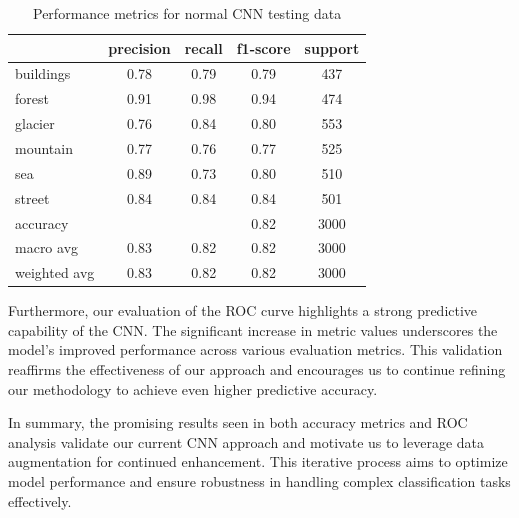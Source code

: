 \documentclass[conference]{IEEEtran}
\begin{document}
\begin{table}[H]
\centering
\begin{tabular}{lcccc}
\toprule
\textbf{} & \textbf{precision} & \textbf{recall} & \textbf{f1-score} & \textbf{support} \\
\midrule
buildings & 0.78 & 0.79 & 0.79 & 437 \\
forest & 0.91 & 0.98 & 0.94 & 474 \\
glacier & 0.76 & 0.84 & 0.80 & 553 \\
mountain & 0.77 & 0.76 & 0.77 & 525 \\
sea & 0.89 & 0.73 & 0.80 & 510 \\
street & 0.84 & 0.84 & 0.84 & 501 \\
\midrule
accuracy & & & 0.82 & 3000 \\
macro avg & 0.83 & 0.82 & 0.82 & 3000 \\
weighted avg & 0.83 & 0.82 & 0.82 & 3000 \\
\bottomrule
\end{tabular}
\caption{Performance metrics for normal CNN testing data}
\end{table}

Furthermore, our evaluation of the ROC curve highlights a strong predictive capability of the CNN. The significant increase in metric values underscores the model's improved performance across various evaluation metrics. This validation reaffirms the effectiveness of our approach and encourages us to continue refining our methodology to achieve even higher predictive accuracy.

In summary, the promising results seen in both accuracy metrics and ROC analysis validate our current CNN approach and motivate us to leverage data augmentation for continued enhancement. This iterative process aims to optimize model performance and ensure robustness in handling complex classification tasks effectively.
\end{document}
